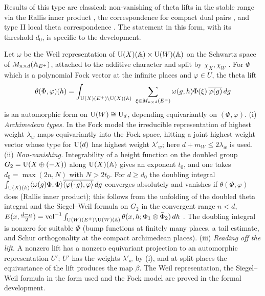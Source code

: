Results of this type are classical: non-vanishing of theta lifts in the stable range via the Rallis
inner product \cite{Rallis1984,Li1992,HarrisKudlaSweet1996}, the correspondence for compact dual pairs
\cite{KashiwaraVergne1978,Howe1989}, and type II local theta correspondence \cite{Minguez2008}. The
statement in this form, with its threshold $d_0$, is specific to the development.

\begin{proofoutline}
Let $\omega$ be the Weil representation of $\mathrm{U}(X)(\mathbb{A})\times\mathrm{U}(W)(\mathbb{A})$ on the Schwartz space
of $M_{n\times d}(\mathbb{A}_{E^+})$, attached to the additive character and split by $\chi_X,\chi_W$
\cite{Weil1964,Kudla1994}. For $\Phi$ which is a polynomial Fock vector at the infinite places and
$\varphi\in U$, the theta lift
\[
  \theta(\Phi,\varphi)(h)=\int_{\galoisU(X)(E^+)\backslash\galoisU(X)(\A)}\ \sum_{\xi\in M_{n\times d}(E^+)}
  \omega(g,h)\Phi(\xi)\,\overline{\varphi(g)}\,dg
\]
is an automorphic form on $\mathrm{U}(W)\cong\mathrm{U}_d$, depending equivariantly on $(\Phi,\varphi)$.
(i) \emph{Archimedean types.} In the Fock model \cite{KashiwaraVergne1978,Howe1989} the irreducible
representation of highest weight $\lambda_w$ maps equivariantly into the Fock space, hitting a joint
highest weight vector whose type for $\mathrm{U}(d)$ has highest weight $\lambda'_w$; here
$d+m_W\le2\lambda_w$ is used.
(ii) \emph{Non-vanishing.} Integrability of a height function on the doubled group
$G_2=\mathrm{U}(X\oplus(-X))$ along $\mathrm{U}(X)(\mathbb{A})$ gives an exponent $t_0$, and one takes
$d_0=\max(2n,N)$ with $N>2t_0$. For $d\ge d_0$ the doubling integral
$\int_{\mathrm{U}(X)(\mathbb{A})}\langle\omega(g)\Phi,\Phi\rangle\overline{\langle\varphi(\cdot\,g),\varphi\rangle}\,dg$
converges absolutely and vanishes if $\theta(\Phi,\varphi)$ does (Rallis inner product); this follows from
the unfolding of the doubled theta integral and the Siegel--Weil formula on $G_2$ in the convergent
range $n<d$,
$E(x,\tfrac{d-n}2)=\operatorname{vol}^{-1}\int_{\mathrm{U}(W)(E^+)\backslash\mathrm{U}(W)(\mathbb{A})}\theta(x,h;\Phi_1\otimes\bar\Phi_2)\,dh$
\cite{Weil1965,KudlaRallis1988,KudlaRallis1994,Ichino2004}. The doubling integral is nonzero for
suitable $\Phi$ (bump functions at finitely many places, a tail estimate, and Schur orthogonality at
the compact archimedean places).
(iii) \emph{Reading off the lift.} A nonzero lift has a nonzero equivariant projection to an
automorphic representation $U'$; $U'$ has the weights $\lambda'_w$ by (i), and at split places the
equivariance of the lift produces the map $\beta$. The Weil representation, the Siegel--Weil formula
in the form used and the Fock model are proved in the formal development.
\end{proofoutline}

